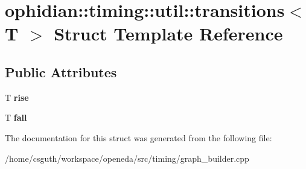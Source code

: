 \hypertarget{structophidian_1_1timing_1_1util_1_1transitions}{\section{ophidian\-:\-:timing\-:\-:util\-:\-:transitions$<$ T $>$ Struct Template Reference}
\label{structophidian_1_1timing_1_1util_1_1transitions}
}
\subsection*{Public Attributes}
\begin{DoxyCompactItemize}
\item 
\hypertarget{structophidian_1_1timing_1_1util_1_1transitions_a7931bfe0f82bff6b39b0041227c8db90}{T {\bfseries rise}}\label{structophidian_1_1timing_1_1util_1_1transitions_a7931bfe0f82bff6b39b0041227c8db90}

\item 
\hypertarget{structophidian_1_1timing_1_1util_1_1transitions_a7227a68139065b442926a6c300fb5d44}{T {\bfseries fall}}\label{structophidian_1_1timing_1_1util_1_1transitions_a7227a68139065b442926a6c300fb5d44}

\end{DoxyCompactItemize}


The documentation for this struct was generated from the following file\-:\begin{DoxyCompactItemize}
\item 
/home/csguth/workspace/openeda/src/timing/graph\-\_\-builder.\-cpp\end{DoxyCompactItemize}

